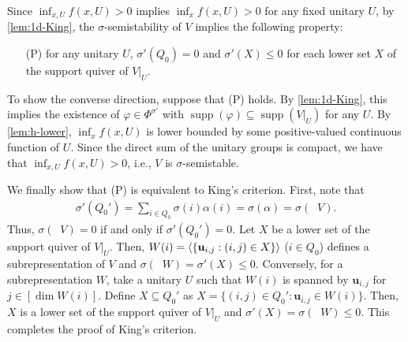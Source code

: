 \documentclass[a4paper,11pt]{article}
\numberwithin{equation}{section}
\newcommand{\bu}{\mathbf{u}}
\DeclareMathOperator{\supp}{supp}
\DeclareMathOperator{\dimv}{\underline{dim}}
\DeclarePairedDelimiter{\spnn}{\langle}{\rangle}
\begin{document}
Since $\inf_{x,U} f(x, U) > 0$ implies $\inf_{x} f(x, U) > 0$ for any fixed unitary $U$, by \cref{lem:1d-King}, the $\sigma$-semistability of $V$ implies the following property:
\begin{itemize}
    \item[(P)] for any unitary $U$, $\sigma'(Q_0) = 0$ and $\sigma'(X) \leq 0$ for each lower set $X$ of the support quiver of $V|_U$.
\end{itemize}
To show the converse direction, suppose that (P) holds.
By \cref{lem:1d-King}, this implies the existence of $\varphi \in \Phi^{\sigma'}$ with $\supp(\varphi) \subseteq \supp(V|_U)$ for any $U$.
By \cref{lem:h-lower}, $\inf_{x} f(x, U)$ is lower bounded by some positive-valued continuous function of $U$.
Since the direct sum of the unitary groups is compact, we have that $\inf_{x, U} f(x, U) > 0$, i.e., $V$ is $\sigma$-semistable.

We finally show that (P) is equivalent to King's criterion.
First, note that
\begin{align}
    \sigma'(Q_0') = \sum_{i \in Q_0} \sigma(i) \alpha(i) = \sigma(\alpha) = \sigma(\dimv V).
\end{align}
Thus, $\sigma(\dimv V) = 0$ if and only if $\sigma'(Q_0') = 0$.
Let $X$ be a lower set of the support quiver of $V|_U$.
Then, $W(i) = \spnn{ \{\bu_{i,j} : (i, j) \in X \}}$ ($i \in Q_0$) defines a subrepresentation of $V$ and $\sigma(\dimv W) = \sigma'(X) \leq 0$.
Conversely, for a subrepresentation $W$, take a unitary $U$ such that $W(i)$ is spanned by $\bu_{i, j}$ for $j \in [\dim W(i)]$.
Define $X \subseteq Q_0'$ as $X = \{ (i, j) \in Q_0' : \bu_{i,j} \in W(i) \}$.
Then, $X$ is a lower set of the support quiver of $V|_U$ and $\sigma'(X) = \sigma(\dimv W) \leq 0$.
This completes the proof of King's criterion.
\end{document}
